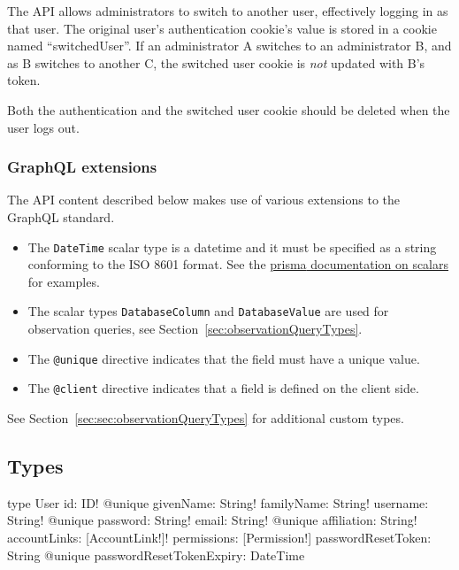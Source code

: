 The API allows administrators to switch to another user, effectively logging in as that user. The original user's authentication cookie's value is stored in a cookie named ``switchedUser''. If an administrator A switches to an administrator B, and as B switches to another C, the switched user cookie is \emph{not} updated with B's token.

Both the authentication and the switched user cookie should be deleted when the user logs out.

\subsubsection{GraphQL extensions}

The API content described below makes use of various extensions to the GraphQL standard.

\begin{itemize}
    \item The \verb|DateTime| scalar type is a datetime and it must be specified as a string conforming to the ISO 8601 format. See the \href{https://www.prisma.io/docs/1.4/reference/service-configuration/data-modelling-(sdl)-eiroozae8u/#scalar-types}{\Gls{prisma} documentation on scalars} for examples.
    \item The scalar types \verb|DatabaseColumn| and \verb|DatabaseValue| are used for observation queries, see Section~\ref{sec:observationQueryTypes}.
    \item The \verb|@unique| directive indicates that the field must have a unique value.
    \item The \verb|@client| directive indicates that a field is defined on the client side.
\end{itemize}

See Section~\ref{sec:sec:observationQueryTypes} for additional custom types.

\subsection{Types}


\begin{code}
type User {
  id: ID! @unique
  givenName: String!
  familyName: String!
  username: String! @unique
  password: String!
  email: String! @unique
  affiliation: String!
  accountLinks: [AccountLink!]!
  permissions: [Permission!]
  passwordResetToken: String @unique
  passwordResetTokenExpiry: DateTime
}
\end{code}

